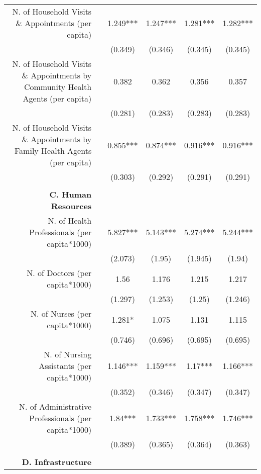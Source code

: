 \begin{table}[h]
\begin{footnotesize}
\begin{center}
{\begin{threeparttable}[b]
\begin{tabular}{rrcccc}
    \multicolumn{1}{p{29.785em}}{N. of Household Visits \& Appointments (per capita)} &       & 1.249*** & 1.247*** & 1.281*** & 1.282*** \\
          &       & (0.349) & (0.346) & (0.345) & (0.345) \\
    \multicolumn{1}{p{29.785em}}{N. of Household Visits \& Appointments by Community Health Agents (per capita)} &       & 0.382 & 0.362 & 0.356 & 0.357 \\
          &       & (0.281) & (0.283) & (0.283) & (0.283) \\
    \multicolumn{1}{p{29.785em}}{N. of Household Visits \& Appointments by Family Health Agents (per capita)} &       & 0.855*** & 0.874*** & 0.916*** & 0.916*** \\
          &       & (0.303) & (0.292) & (0.291) & (0.291) \\
          &       &       &       &       &  \\
    \midrule
    \multicolumn{1}{p{29.785em}}{\textbf{C. Human Resources}} &       &       &       &       &  \\
    \multicolumn{1}{p{29.785em}}{N. of Health Professionals (per capita*1000)} &       & 5.827*** & 5.143*** & 5.274*** &  5.244***  \\
          &       & (2.073) & (1.95) & (1.945) &  (1.94)  \\
    \multicolumn{1}{p{29.785em}}{N. of Doctors (per capita*1000)} &       & 1.56  & 1.176 & 1.215 &  1.217  \\
          &       & (1.297) & (1.253) & (1.25) &  (1.246)  \\
    \multicolumn{1}{p{29.785em}}{N. of Nurses (per capita*1000)} &       & 1.281* & 1.075 & 1.131 &  1.115  \\
          &       & (0.746) & (0.696) & (0.695) &  (0.695)  \\
    \multicolumn{1}{p{29.785em}}{N. of Nursing Assistants (per capita*1000)} &       & 1.146*** & 1.159*** & 1.17*** &  1.166***  \\
          &       & (0.352) & (0.346) & (0.347) &  (0.347)  \\
    \multicolumn{1}{p{29.785em}}{N. of Administrative Professionals (per capita*1000)} &       & 1.84*** & 1.733*** & 1.758*** &  1.746***  \\
          &       & (0.389) & (0.365) & (0.364) &  (0.363)  \\
          &       &       &       &       &  \\
    \midrule
    \multicolumn{1}{p{29.785em}}{\textbf{D. Infrastructure}} &       &       &       &       &  \\

\end{tabular}
\end{threeparttable}}
\end{center}
\end{footnotesize}
\end{table}
